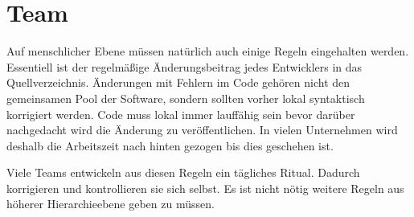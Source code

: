 \section{Team}
Auf menschlicher Ebene müssen natürlich auch einige Regeln eingehalten werden. Essentiell ist der regelmäßige Änderungsbeitrag jedes Entwicklers in das Quellverzeichnis. Änderungen mit Fehlern im Code gehören nicht den gemeinsamen Pool der Software, sondern sollten vorher lokal syntaktisch korrigiert werden.
Code muss lokal immer lauffähig sein bevor darüber nachgedacht wird die Änderung zu veröffentlichen. In vielen Unternehmen wird deshalb die Arbeitszeit nach hinten gezogen bis dies geschehen ist.

Viele Teams entwickeln aus diesen Regeln ein tägliches Ritual. Dadurch korrigieren und kontrollieren sie sich selbst. Es ist nicht nötig weitere Regeln aus höherer Hierarchieebene geben zu müssen.